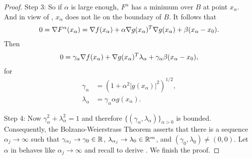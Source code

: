 \begin{proof}
Step 3: So if $\alpha$ is large enough, $F^\alpha$ has a minimum over $B$ at point $x_\alpha$.
And in view of , $x_\alpha$ does not lie on the boundary of $B$.
It follows that
\begin{align}
0 = \grad F^\alpha (x_\alpha) = \grad f(x_\alpha) + \alpha \grad g(x_\alpha)^T \grad g(x_\alpha) + \beta (x_\alpha - x_0).
\labeq{proof_FJcfvf_eq_6}
\end{align}
Then
\begin{align}
0 = \gamma_\alpha \grad f(x_\alpha) + \grad g(x_\alpha)^T \lambda_\alpha + \gamma_\alpha \beta (x_\alpha - x_0),
\labeq{proof_FJcfvf_eq_7}
\end{align}
for
\begin{align}
\gamma_\alpha  &= (1+\alpha^2|g(x_\alpha)|^2)^{1/2}, \\
\lambda_\alpha &= \gamma_\alpha \alpha g(x_\alpha).
\end{align}

Step 4: Now $\gamma_\alpha^2 + \lambda_\alpha^2 = 1$ and therefore $\{(\gamma_\alpha, \lambda_\alpha)\}_{\alpha >0}$ is bounded.
Consequently, the Bolzano-Weierstrass Theorem asserts that there is a sequence $\alpha_j \to \infty$ such that $
\gamma_{\alpha_j} \to \gamma_0 \in \mathbb{R}$, $\lambda_{\alpha_j} \to \lambda_0 \in \mathbb{R}^m$, and $(\gamma_0, \lambda_0) \neq (0, 0)$.
Let $\alpha$ in  behaves like $\alpha_j \to \infty$ and recall  to derive .
We finish the proof.
\end{proof}

